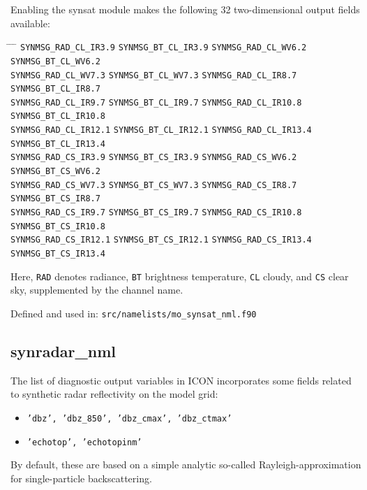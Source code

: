Enabling the synsat module makes the following 32 two-dimensional output fields available:
%
{\renewcommand{\baselinestretch}{1.25}\normalsize%
\begin{tabbing}
\hspace*{14em} \= \hspace*{14em} \= \hspace*{14em} \= \hspace*{14em} \kill
\verb+SYNMSG_RAD_CL_IR3.9+   \>  \verb+SYNMSG_BT_CL_IR3.9+    \>
\verb+SYNMSG_RAD_CL_WV6.2+   \>   \verb+SYNMSG_BT_CL_WV6.2+   \\
\verb+SYNMSG_RAD_CL_WV7.3+   \>   \verb+SYNMSG_BT_CL_WV7.3+   \>
\verb+SYNMSG_RAD_CL_IR8.7+   \>   \verb+SYNMSG_BT_CL_IR8.7+   \\
\verb+SYNMSG_RAD_CL_IR9.7+   \>   \verb+SYNMSG_BT_CL_IR9.7+   \>
\verb+SYNMSG_RAD_CL_IR10.8+  \>   \verb+SYNMSG_BT_CL_IR10.8+  \\
\verb+SYNMSG_RAD_CL_IR12.1+  \>   \verb+SYNMSG_BT_CL_IR12.1+  \>
\verb+SYNMSG_RAD_CL_IR13.4+  \>   \verb+SYNMSG_BT_CL_IR13.4+  \\
\verb+SYNMSG_RAD_CS_IR3.9+   \>   \verb+SYNMSG_BT_CS_IR3.9+   \>
\verb+SYNMSG_RAD_CS_WV6.2+   \>   \verb+SYNMSG_BT_CS_WV6.2+   \\
\verb+SYNMSG_RAD_CS_WV7.3+   \>   \verb+SYNMSG_BT_CS_WV7.3+   \>
\verb+SYNMSG_RAD_CS_IR8.7+   \>   \verb+SYNMSG_BT_CS_IR8.7+   \\
\verb+SYNMSG_RAD_CS_IR9.7+   \>   \verb+SYNMSG_BT_CS_IR9.7+   \>
\verb+SYNMSG_RAD_CS_IR10.8+  \>   \verb+SYNMSG_BT_CS_IR10.8+  \\
\verb+SYNMSG_RAD_CS_IR12.1+  \>   \verb+SYNMSG_BT_CS_IR12.1+  \>
\verb+SYNMSG_RAD_CS_IR13.4+  \>   \verb+SYNMSG_BT_CS_IR13.4+
\end{tabbing}
}
Here,
\verb+RAD+ denotes radiance,
\verb+BT+ brightness temperature,
\verb+CL+ cloudy, and
\verb+CS+ clear sky,
supplemented by the channel name.

Defined and used in: \verb+src/namelists/mo_synsat_nml.f90+

\subsection[synradar\_nml]{synradar\_nml}%

  The list of diagnostic output variables in ICON incorporates some fields related
  to synthetic radar reflectivity on the model grid:
  \begin{itemize}
    \item \texttt{'dbz', 'dbz\_850', 'dbz\_cmax', 'dbz\_ctmax'}
    \item \texttt{'echotop', 'echotopinm'}
  \end{itemize}
  By default, these are based on
  a simple analytic so-called Rayleigh-approximation for single-particle backscattering.

